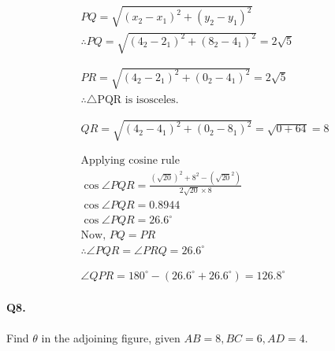 \documentclass{article}
\begin{document}
\[
  \begin{aligned}
    PQ = \sqrt{(x_{2}-x_{1})^{2}+(y_{2}-y_{1})^{2}} \\
    \therefore PQ = \sqrt{(4_{2}-2_{1})^{2}+(8_{2}-4_{1})^{2}} = 2\sqrt{5} \\
    \\
    \\
    PR = \sqrt{(4_{2}-2_{1})^{2}+(0_{2}-4_{1})^{2}} = 2\sqrt{5} \\
    \therefore \triangle \text{PQR is isosceles.} \\
    \\
    \\
    QR = \sqrt{(4_{2}-4_{1})^{2}+(0_{2}-8_{1})^{2}} = \sqrt{0+64} = 8 \\
    \\
    \\
    \text{Applying cosine rule} \\
    \cos \angle PQR = \frac{(\sqrt{20})^{2}+8^{2}-(\sqrt{20}^{2})}{2\sqrt{20}\times 8} \\
    \cos \angle PQR = 0.8944 \\
    \cos \angle PQR = 26.6^{\circ} \\
    \text{Now, } PQ = PR \\
    \therefore \angle PQR = \angle PRQ = 26.6^{\circ} \\
    \\
    \\
    \angle QPR = 180^{\circ}-(26.6^{\circ}+26.6^{\circ}) = 126.8^{\circ}
  \end{aligned}
\]

\paragraph{Q8.}
Find $\theta$ in the adjoining figure, given $AB=8, BC=6, AD=4$.

\end{document}
